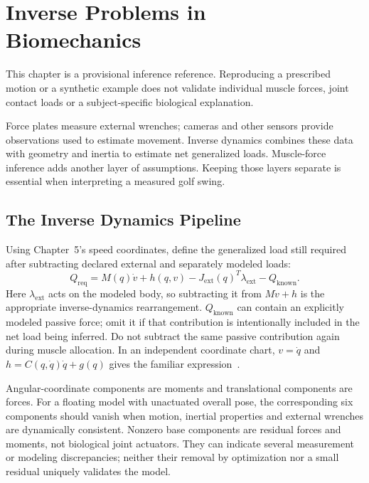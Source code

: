 \chapter[Inverse Problems in Biomechanics]{Inverse Problems in\\Biomechanics}
\label{ch:inverse-problems}

\begin{gomdraftnotice}
This chapter is a provisional inference reference. Reproducing a prescribed
motion or a synthetic example does not validate individual muscle forces,
joint contact loads or a subject-specific biological explanation.
\end{gomdraftnotice}

Force plates measure external wrenches; cameras and other sensors provide
observations used to estimate movement. Inverse dynamics combines these data
with geometry and inertia to estimate net generalized loads. Muscle-force
inference adds another layer of assumptions. Keeping those layers separate is
essential when interpreting a measured golf swing.

\section{The Inverse Dynamics Pipeline}

Using Chapter~5's speed coordinates, define the generalized load still required
after subtracting declared external and separately modeled loads:
\begin{equation}
 Q_{\mathrm{req}}=M(q)\dot v+h(q,v)-J_{\mathrm{ext}}(q)^T\lambda_{\mathrm{ext}}
                  -Q_{\mathrm{known}}.
 \label{eq:ch6:inverse-dynamics}
\end{equation}
Here $\lambda_{\mathrm{ext}}$ acts on the modeled body, so subtracting it from
$M\dot v+h$ is the appropriate inverse-dynamics rearrangement.
$Q_{\mathrm{known}}$ can contain an explicitly modeled passive force; omit it
if that contribution is intentionally included in the net load being inferred.
Do not subtract the same passive contribution again during muscle allocation.
In an independent coordinate chart, $v=\dot q$ and
$h=C(q,\dot q)\dot q+g(q)$ gives the familiar expression~\cite{OpenSimIDBiological}.

Angular-coordinate components are moments and translational components are forces.
For a floating model with unactuated overall pose, the corresponding six
components should vanish when motion, inertial properties and external wrenches
are dynamically consistent. Nonzero base components are residual forces and
moments, not biological joint actuators. They can indicate several measurement
or modeling discrepancies; neither their removal by optimization nor a small
residual uniquely validates the model.

